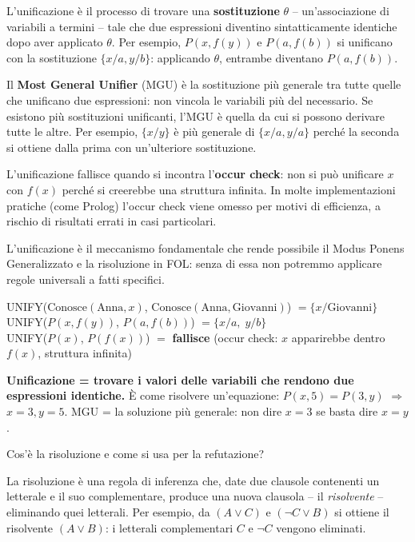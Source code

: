 \documentclass[12pt,a4paper]{article}
\begin{document}
L'unificazione è il processo di trovare una \textbf{sostituzione} $\theta$ -- un'associazione di variabili a termini -- tale che due espressioni diventino sintatticamente identiche dopo aver applicato $\theta$. Per esempio, $P(x, f(y))$ e $P(a, f(b))$ si unificano con la sostituzione $\{x/a, y/b\}$: applicando $\theta$, entrambe diventano $P(a, f(b))$.

Il \textbf{Most General Unifier} (MGU) è la sostituzione più generale tra tutte quelle che unificano due espressioni: non vincola le variabili più del necessario. Se esistono più sostituzioni unificanti, l'MGU è quella da cui si possono derivare tutte le altre. Per esempio, $\{x/y\}$ è più generale di $\{x/a, y/a\}$ perché la seconda si ottiene dalla prima con un'ulteriore sostituzione.

L'unificazione fallisce quando si incontra l'\textbf{occur check}: non si può unificare $x$ con $f(x)$ perché si creerebbe una struttura infinita. In molte implementazioni pratiche (come Prolog) l'occur check viene omesso per motivi di efficienza, a rischio di risultati errati in casi particolari.

L'unificazione è il meccanismo fondamentale che rende possibile il Modus Ponens Generalizzato e la risoluzione in FOL: senza di essa non potremmo applicare regole universali a fatti specifici.

\begin{esempiobox}
UNIFY($\text{Conosce}(\text{Anna}, x)$,\; $\text{Conosce}(\text{Anna}, \text{Giovanni})$) $= \{x/\text{Giovanni}\}$ \\
UNIFY($P(x, f(y))$,\; $P(a, f(b))$) $= \{x/a,\; y/b\}$ \\
UNIFY($P(x)$,\; $P(f(x))$) $=$ \textbf{fallisce} (occur check: $x$ apparirebbe dentro $f(x)$, struttura infinita)
\end{esempiobox}

\begin{ricordabox}
\textbf{Unificazione = trovare i valori delle variabili che rendono due espressioni identiche.} È come risolvere un'equazione: $P(x, 5) = P(3, y)$ $\Rightarrow$ $x=3, y=5$. MGU = la soluzione più generale: non dire $x=3$ se basta dire $x=y$.
\end{ricordabox}

\begin{domandabox}{Cos'è la risoluzione e come si usa per la refutazione?}
\end{domandabox}

La risoluzione è una regola di inferenza che, date due clausole contenenti un letterale e il suo complementare, produce una nuova clausola -- il \emph{risolvente} -- eliminando quei letterali. Per esempio, da $(A \lor C)$ e $(\neg C \lor B)$ si ottiene il risolvente $(A \lor B)$: i letterali complementari $C$ e $\neg C$ vengono eliminati.
\end{document}

